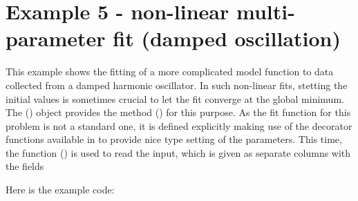 \documentclass[a4paper,10pt,english]{sphinxmanual}
\begin{document}
\section{Example 5 - non-linear multi-parameter fit (damped oscillation)}
\label{index:example-5-non-linear-multi-parameter-fit-damped-oscillation}
This example shows the fitting of a more complicated model function
to data collected from a damped harmonic oscillator. In such
non-linear fits, stetting the initial values is sometimes crucial
to let the fit converge at the global minimum. The {\hyperref[index:kafe.fit.Fit]{\emph{}}} ()
object provides the method {\hyperref[index:kafe.fit.Fit.set_parameters]{\emph{}}} () for this
purpose. As the fit function for this problem is not a standard one, it is
defined explicitly making use of the decorator functions available in
 to provide nice type setting of the parameters. This time,
the function {\hyperref[index:kafe.file_tools.parse_column_data]{\emph{}}} () is used to read
the input, which is given as separate columns with the fields
\begin{quote}

\end{quote}

Here is the example code:
\end{document}
